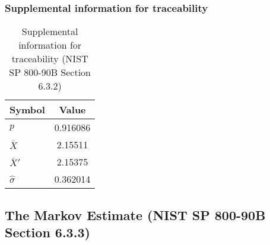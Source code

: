 \documentclass[a3paper,xelatex,english]{bxjsarticle}
\begin{document}
\subsubsection{Supplemental information for traceability}
\renewcommand{\arraystretch}{1.8}
\begin{table}[h]
\caption{Supplemental information for traceability (NIST SP 800-90B Section 6.3.2)}
\begin{center}
\begin{tabular}{|l|c|}
\hline 
\rowcolor{anotherlightblue} %
Symbol				& Value \\ \hline 
$p$				& 0.916086\\ \hline 
$\bar{X}$ 		&  2.15511\\ \hline
$\bar{X}'$		&  2.15375\\ \hline
$\hat{\sigma}$		& 0.362014\\ \hline
\end{tabular}
\end{center}
\end{table}
\renewcommand{\arraystretch}{1.4}
\clearpage
\subsection{The Markov Estimate (NIST SP 800-90B Section 6.3.3)}\label{sec:Binary633}
\end{document}
